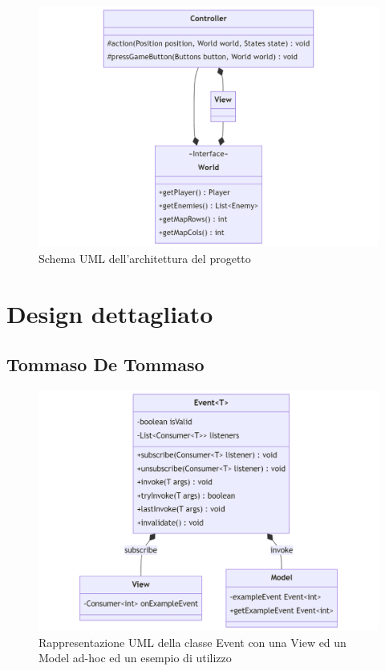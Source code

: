 \documentclass[a4paper,12pt]{report}
\begin{document}
\begin{figure}[H]
	\centering{}
	\includegraphics[width=\textwidth]{img/Architecture.png}
	\caption{Schema UML dell'architettura del progetto}
	\label{img:Architecture}
\end{figure}

\section{Design dettagliato}

\subsection*{Tommaso De Tommaso}
\begin{figure}[H]
	\centering{}
	\includegraphics[width=\textwidth]{img/Event.png}
	\caption{Rappresentazione UML della classe Event con una View ed un Model ad-hoc ed un esempio di utilizzo}
	\label{img:Event}
\end{figure}
\end{document}
